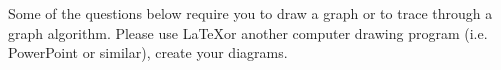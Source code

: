 \documentclass[addpoints,11pt]{exam}
\begin{document}
\pagestyle{empty}


\\
\\

%
%
%
\renewcommand{\solutiontitle}{\noindent\textbf{Answer:}\par\noindent}
\printanswers


Some of the questions below require you to draw a graph or to trace through a graph algorithm.  Please use \LaTeX or another computer drawing program (i.e. PowerPoint or similar), create your diagrams.
\end{document}
